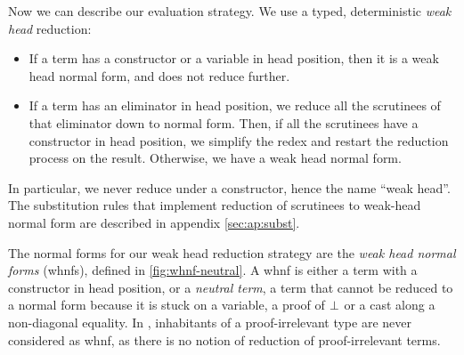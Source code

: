 Now we can describe our evaluation strategy. We use a typed, deterministic 
\emph{weak head} reduction: 
\begin{itemize}
\item If a term has a constructor or a variable in head position, then it is a 
	weak head normal form, and does not reduce further.
\item If a term has an eliminator in head position, we reduce all the scrutinees 
	of that eliminator down to normal form. Then, if all the scrutinees have a 
	constructor in head position, we simplify the redex and restart the reduction process 
	on the result. Otherwise, we have a weak head normal form.
\end{itemize} 

In particular, we never reduce under a constructor, hence the name ``weak head''.
% 
The substitution rules that implement reduction of scrutinees to weak-head normal
form are described in appendix \ref{sec:ap:subst}.

The normal forms for our weak head reduction strategy are the \emph{weak head normal forms} 
(whnfs), defined in \cref{fig:whnf-neutral}. 
% 
A whnf is either a term with a constructor in head position, or a \emph{neutral term},
\ie a term that cannot be reduced to a normal form because it is stuck on a
variable, a proof of \( \bot \) or a cast along a non-diagonal equality.
%
In \SetoidCC, inhabitants of a proof-irrelevant type are never
considered as whnf, as there is no notion of reduction of
proof-irrelevant terms.

